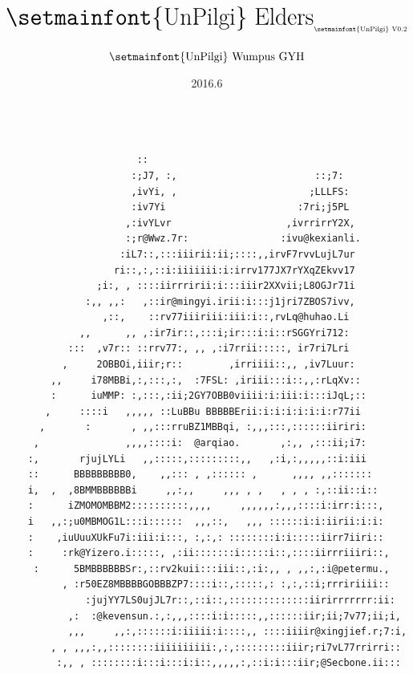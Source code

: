 \documentclass{article}
\title{$\text{\Huge{{\setmainfont{UnPilgi} Elders}}}_{\text{\setmainfont{UnPilgi} V0.2}}$}
\author{$\text{\setmainfont{UnPilgi} Wumpus GYH}$}
\date{2016.6}
\begin{document}


\begin{titlepage}

\maketitle
\setcounter{page}{0}
\thispagestyle{empty}

\begin{verbatim}

                       ::
                      :;J7, :,                        ::;7:
                      ,ivYi, ,                       ;LLLFS:
                      :iv7Yi                       :7ri;j5PL
                     ,:ivYLvr                    ,ivrrirrY2X,
                     :;r@Wwz.7r:                :ivu@kexianli.
                    :iL7::,:::iiirii:ii;::::,,irvF7rvvLujL7ur
                   ri::,:,::i:iiiiiii:i:irrv177JX7rYXqZEkvv17
                ;i:, , ::::iirrririi:i:::iiir2XXvii;L8OGJr71i
              :,, ,,:   ,::ir@mingyi.irii:i:::j1jri7ZBOS7ivv,
                 ,::,    ::rv77iiiriii:iii:i::,rvLq@huhao.Li
             ,,      ,, ,:ir7ir::,:::i;ir:::i:i::rSGGYri712:
           :::  ,v7r:: ::rrv77:, ,, ,:i7rrii:::::, ir7ri7Lri
          ,     2OBBOi,iiir;r::        ,irriiii::,, ,iv7Luur:
        ,,     i78MBBi,:,:::,:,  :7FSL: ,iriii:::i::,,:rLqXv::
        :      iuMMP: :,:::,:ii;2GY7OBB0viiii:i:iii:i:::iJqL;::
       ,     ::::i   ,,,,, ::LuBBu BBBBBErii:i:i:i:i:i:i:r77ii
      ,       :       , ,,:::rruBZ1MBBqi, :,,,:::,::::::iiriri:
     ,               ,,,,::::i:  @arqiao.       ,:,, ,:::ii;i7:
    :,       rjujLYLi   ,,:::::,:::::::::,,   ,:i,:,,,,,::i:iii
    ::      BBBBBBBBB0,    ,,::: , ,:::::: ,      ,,,, ,,:::::::
    i,  ,  ,8BMMBBBBBBi     ,,:,,     ,,, , ,   , , , :,::ii::i::
    :      iZMOMOMBBM2::::::::::,,,,     ,,,,,,:,,,::::i:irr:i:::,
    i   ,,:;u0MBMOG1L:::i::::::  ,,,::,   ,,, ::::::i:i:iirii:i:i:
    :    ,iuUuuXUkFu7i:iii:i:::, :,:,: ::::::::i:i:::::iirr7iiri::
    :     :rk@Yizero.i:::::, ,:ii:::::::i:::::i::,::::iirrriiiri::,
     :      5BMBBBBBBSr:,::rv2kuii:::iii::,:i:,, , ,,:,:i@petermu.,
          , :r50EZ8MBBBBGOBBBZP7::::i::,:::::,: :,:,::i;rrririiii::
              :jujYY7LS0ujJL7r::,::i::,::::::::::::::iirirrrrrrr:ii:
           ,:  :@kevensun.:,:,,,::::i:i:::::,,::::::iir;ii;7v77;ii;i,
           ,,,     ,,:,::::::i:iiiii:i::::,, ::::iiiir@xingjief.r;7:i,
        , , ,,,:,,::::::::iiiiiiiiii:,:,:::::::::iiir;ri7vL77rrirri::
         :,, , ::::::::i:::i:::i:i::,,,,,:,::i:i:::iir;@Secbone.ii:::
\end{verbatim}
\end{titlepage}
\newpage
\end{document}
